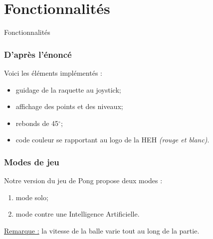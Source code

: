 \section{Fonctionnalités}
    
    \begin{frame}
        
        \begin{center}
            \huge{Fonctionnalités}
        \end{center}
        
    \end{frame}
    
    \begin{frame}
        \frametitle{D'après l'énoncé}
        
        Voici les éléments implémentés :
        \begin{itemize}
        
            \item guidage de la raquette au joystick;
            \item affichage des points et des niveaux;
            \item rebonds de 45$^{\circ}$;
            \item code couleur se rapportant au logo de la HEH \textit{(rouge et blanc)}.
            
        \end{itemize}
        
    \end{frame}
    
    \begin{frame}
        \frametitle{Modes de jeu}
        
        Notre version du jeu de Pong propose deux modes :
        
         \begin{enumerate}
        
            \item mode solo;
            \item mode contre une Intelligence Artificielle.
            
        \end{enumerate}
        
        \vspace{1cm}

        \underline{Remarque :} la vitesse de la balle varie tout au long de la partie.
        
    \end{frame}